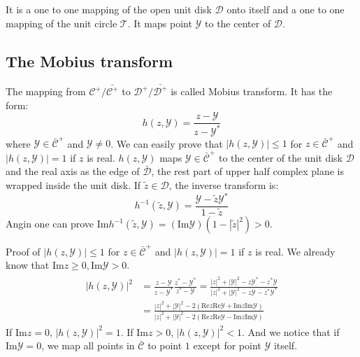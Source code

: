 \documentclass[
	preprint,%
	aps,
	prb,
	showpacs,	
	amsmath, amssymb]{revtex4-2}
\DeclareRobustCommand{\+}{\hstretch{1.25} {\boldsymbol {\mathrel{+}}}}
\newcommand{\im}{ {\mathrm{Im}} }
\newcommand{\re}{ {\mathrm{Re}} }
\newcommand{\Y}{ {\mathcal{Y}} }
\newcommand{\C}{ {\mathcal{C}} }
\newcommand{\Cbar}{ {\bar{\mathcal{C}}} }
\newcommand{\D}{ {\mathcal{D}} }
\newcommand{\Dbar}{ {\bar{\mathcal{D}}} }
\begin{document}
It is a one to one mapping of the open unit disk $\D$ onto 
itself and a one to one mapping of the unit circle $\mathcal{T}$.
It maps point $\Y$ to the center of $\D$.


\subsection{The Mobius transform}
\label{appsub:mobius-transform}
The mapping from $\C^+/\bar{\C^+}$ to 
$\D^+/\bar{\D^+}$ is called Mobius transform.
It has the form:
\begin{equation}\label{eq:def-mobius-transform}
	h(z, \Y)  = \frac{z - \Y}{z - \Y^*}
\end{equation}
where $\Y \in \Cbar^+$ and $\Y \neq 0$. We can easily prove that 
$|h(z, \Y)| \leq 1$ for $z \in \Cbar^+$ and
$|h(z, \Y)| = 1$ if $z$ is real. $h(z, \Y)$ maps $\Y \in \Cbar^+$
to the center of the unit disk $\D$ and the real axis as the 
edge of $\Dbar$, the rest part of upper half complex plane is 
wrapped inside the unit disk. If $ \tilde{z} \in \D$, the inverse 
transform is:
\begin{equation}\label{eq:def-inv-mobius-transform}
	h^{-1}(\tilde{z}, \Y) = \frac{\Y - \tilde{z}\Y^*}{1 - \tilde{z}}
\end{equation}
Angin one can prove 
$\im h^{-1}(\tilde{z}, \Y) = (\im\Y)(1 - |\tilde{z}|^2 ) > 0$.

Proof of $|h(z, \Y)| \leq 1$ for $z \in \Cbar^+$ and
$|h(z, \Y)| = 1$ if $z$ is real. 
We already know that $\im z \geq 0,  \im \Y >0$.
\begin{align}
\begin{split}
|h(z, \Y)|^2 &= \frac{z - \Y}{z - \Y^*} \frac{z^* - \Y^*}{z^* - \Y} 
	  = \frac{|z|^2 + |\Y|^2 - z\Y^* - z^*\Y}{|z|^2 + |\Y|^2 - z\Y - z^*\Y^*}\\
	& = \frac{|z|^2 + |\Y|^2 - 2(\re z \re \Y  + \im z \im \Y)}
		{|z|^2 + |\Y|^2 - 2(\re z \re \Y  - \im z \im \Y)}
\end{split}
\end{align}
If $\im z = 0$, $|h(z, \Y)|^2 = 1$. If $\im z > 0$, $|h(z, \Y)|^2 < 1$.
And we notice that if $\im \Y = 0$, we map all points in $\Cbar$ to 
point $1$ except for point $\Y$ itself.


\end{document}
